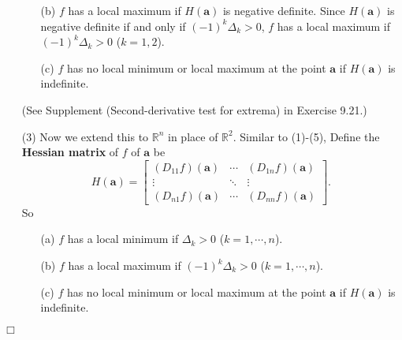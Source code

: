 \documentclass{article}
\begin{document}
\begin{enumerate}
\begin{enumerate}
  \item[(b)]
    $f$ has a local maximum if $H(\mathbf{a})$ is negative definite.
    Since $H(\mathbf{a})$ is negative definite if and only if
    $(-1)^k \Delta_k > 0$,
    $f$ has a local maximum if $(-1)^k \Delta_k > 0$ ($k = 1, 2$).

  \item[(c)]
    $f$ has no local minimum or local maximum at the point $\mathbf{a}$
    if $H(\mathbf{a})$ is indefinite.
  \end{enumerate}
  (See Supplement (Second-derivative test for extrema) in Exercise 9.21.)

\item[(3)]
  Now we extend this to $\mathbb{R}^n$ in place of $\mathbb{R}^2$.
  Similar to (1)-(5),
  Define the \textbf{Hessian matrix} of $f$ of $\mathbf{a}$ be
  \[
    H(\mathbf{a}) = \begin{bmatrix}
      (D_{11}f)(\mathbf{a}) & \cdots & (D_{1n}f)(\mathbf{a}) \\
      \vdots & \ddots & \vdots \\
      (D_{n1}f)(\mathbf{a}) & \cdots & (D_{nn}f)(\mathbf{a})
    \end{bmatrix}.
  \]
  So
  \begin{enumerate}
  \item[(a)]
    $f$ has a local minimum if $\Delta_k > 0$ ($k = 1, \cdots, n$).

  \item[(b)]
    $f$ has a local maximum if $(-1)^k \Delta_k > 0$ ($k = 1, \cdots, n$).

  \item[(c)]
    $f$ has no local minimum or local maximum at the point $\mathbf{a}$
    if $H(\mathbf{a})$ is indefinite.
  \end{enumerate}
\end{enumerate}
$\Box$ \\\\



\end{document}
